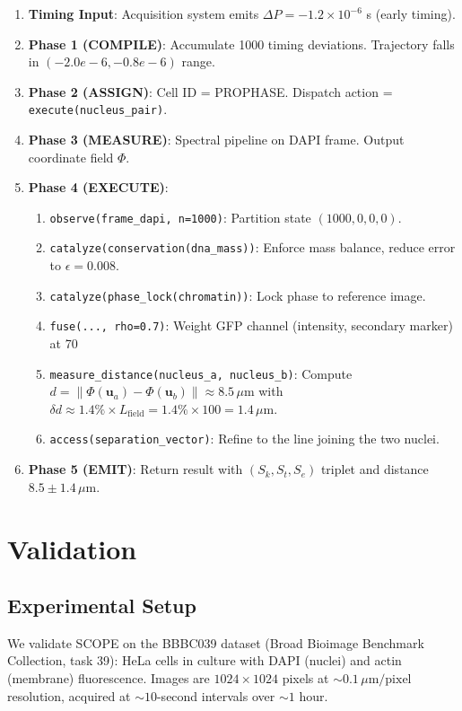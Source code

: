 \documentclass[11pt,twocolumn]{article}
\begin{document}
\begin{enumerate}
\item \textbf{Timing Input}: Acquisition system emits $\Delta P = -1.2 \times 10^{-6}$ s (early timing).
\item \textbf{Phase 1 (COMPILE)}: Accumulate 1000 timing deviations. Trajectory falls in $(-2.0e-6, -0.8e-6)$ range.
\item \textbf{Phase 2 (ASSIGN)}: Cell ID = PROPHASE. Dispatch action = \texttt{execute(nucleus\_pair)}.
\item \textbf{Phase 3 (MEASURE)}: Spectral pipeline on DAPI frame. Output coordinate field $\Phi$.
\item \textbf{Phase 4 (EXECUTE)}:
  \begin{enumerate}
  \item \texttt{observe(frame\_dapi, n=1000)}: Partition state $(1000, 0, 0, 0)$.
  \item \texttt{catalyze(conservation(dna\_mass))}: Enforce mass balance, reduce error to $\epsilon = 0.008$.
  \item \texttt{catalyze(phase\_lock(chromatin))}: Lock phase to reference image.
  \item \texttt{fuse(..., rho=0.7)}: Weight GFP channel (intensity, secondary marker) at 70%
  \item \texttt{measure\_distance(nucleus\_a, nucleus\_b)}: Compute $d = \|\Phi(\mathbf{u}_a) - \Phi(\mathbf{u}_b)\| \approx 8.5 \, \mu\text{m}$ with $\delta d \approx 1.4\% \times L_{\text{field}} = 1.4\% \times 100 = 1.4 \, \mu\text{m}$.
  \item \texttt{access(separation\_vector)}: Refine to the line joining the two nuclei.
  \end{enumerate}
\item \textbf{Phase 5 (EMIT)}: Return result with $(S_k, S_t, S_e)$ triplet and distance $8.5 \pm 1.4 \, \mu\text{m}$.
\end{enumerate}

\section{Validation}

\subsection{Experimental Setup}

We validate SCOPE on the BBBC039 dataset (Broad Bioimage Benchmark Collection, task 39): HeLa cells in culture with DAPI (nuclei) and actin (membrane) fluorescence. Images are $1024 \times 1024$ pixels at $\sim 0.1 \, \mu\text{m/pixel}$ resolution, acquired at $\sim 10$-second intervals over $\sim 1$ hour.
\end{document}
